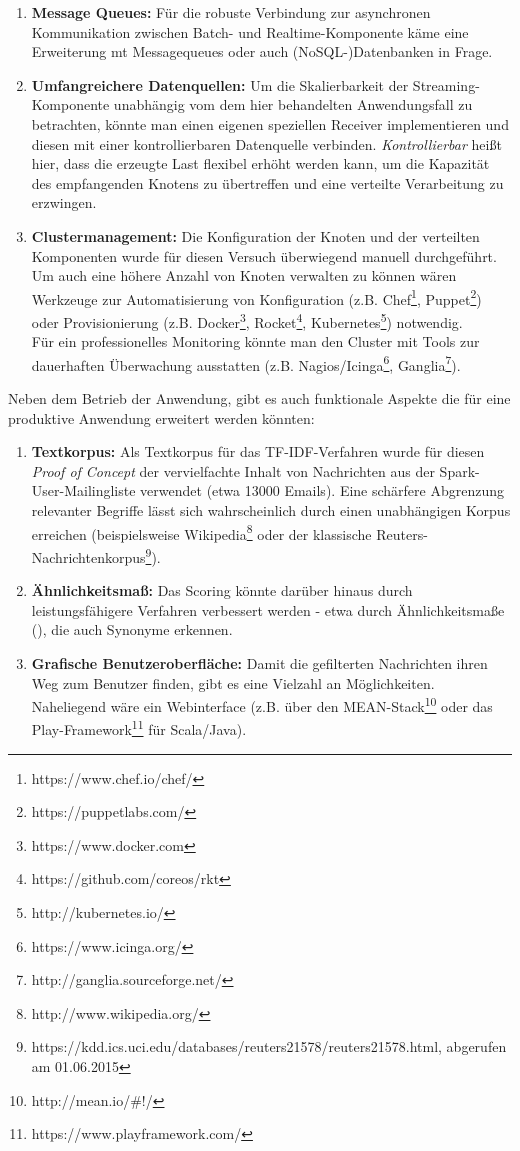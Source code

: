 \begin{enumerate}
	\item \textbf{Message Queues:} Für die robuste Verbindung zur asynchronen Kommunikation zwischen Batch- und Realtime-Komponente käme eine Erweiterung mt Messagequeues oder auch (NoSQL-)Datenbanken in Frage.
	\item \textbf{Umfangreichere Datenquellen:} Um die Skalierbarkeit der Streaming-Komponente unabhängig vom dem hier behandelten Anwendungsfall zu betrachten, könnte man einen eigenen speziellen Receiver implementieren und diesen mit einer kontrollierbaren Datenquelle verbinden. \textit{Kontrollierbar} heißt hier, dass die erzeugte Last flexibel erhöht werden kann, um die Kapazität des empfangenden Knotens zu übertreffen und eine verteilte Verarbeitung zu erzwingen.
	\item \textbf{Clustermanagement:} Die Konfiguration der Knoten und der verteilten Komponenten wurde für diesen Versuch überwiegend manuell durchgeführt. Um auch eine höhere Anzahl von Knoten verwalten zu können wären Werkzeuge zur Automatisierung von Konfiguration (z.B. Chef\footnote{https://www.chef.io/chef/}, Puppet\footnote{https://puppetlabs.com/}) oder Provisionierung (z.B. Docker\footnote{https://www.docker.com}, Rocket\footnote{https://github.com/coreos/rkt}, Kubernetes\footnote{http://kubernetes.io/}) notwendig.\\
	Für ein professionelles Monitoring könnte man den Cluster mit Tools zur dauerhaften Überwachung ausstatten (z.B. Nagios/Icinga\footnote{https://www.icinga.org/}, Ganglia\footnote{http://ganglia.sourceforge.net/}).
\end{enumerate}

Neben dem Betrieb der Anwendung, gibt es auch funktionale Aspekte die für eine produktive Anwendung erweitert werden könnten:

\begin{enumerate}
	\item \textbf{Textkorpus:} Als Textkorpus für das TF-IDF-Verfahren wurde für diesen \textit{Proof of Concept} der vervielfachte Inhalt von Nachrichten aus der Spark-User-Mailingliste verwendet (etwa 13000 Emails). Eine schärfere Abgrenzung relevanter Begriffe lässt sich wahrscheinlich durch einen unabhängigen Korpus erreichen (beispielsweise Wikipedia\footnote{http://www.wikipedia.org/} oder der klassische Reuters-Nachrichtenkorpus\footnote{https://kdd.ics.uci.edu/databases/reuters21578/reuters21578.html, abgerufen am 01.06.2015}).
	\item \textbf{Ähnlichkeitsmaß:} Das Scoring könnte darüber hinaus durch leistungsfähigere Verfahren verbessert werden - etwa durch Ähnlichkeitsmaße (\cite{Huang:2008}), die auch Synonyme erkennen.
	\item \textbf{Grafische Benutzeroberfläche:} Damit die gefilterten Nachrichten ihren Weg zum Benutzer finden, gibt es eine Vielzahl an Möglichkeiten. Naheliegend wäre ein Webinterface (z.B. über den MEAN-Stack\footnote{http://mean.io/#!/} oder das Play-Framework\footnote{https://www.playframework.com/} für Scala/Java).
\end{enumerate}